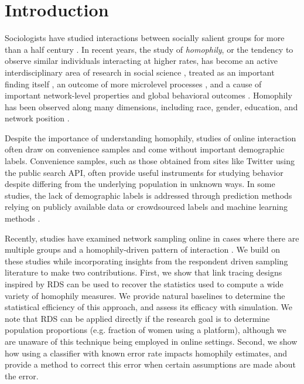 \documentclass[a4paper]{article}
\begin{document}
\section{Introduction}

Sociologists have studied interactions between socially salient groups for more than a half century \cite{coleman_relational_1958,katz_}. In recent years, the study of \emph{homophily}, or the tendency to observe similar individuals interacting at higher rates, has become an active interdisciplinary area of research in social science \cite{mcpherson_birds_2001}, treated as an important finding itself \cite{marsden_core_1987,lewis_tastes_2008}, an outcome of more microlevel processes \cite{currarini_economic_2009,bramoulle_homophily_2012}, and a cause of important network-level properties \cite{barabasi_emergence_1999} and global behavioral outcomes \cite{}. Homophily has been observed along many dimensions, including race, gender, education, and network position \cite{}.

Despite the importance of understanding homophily, studies of online interaction often draw on convenience samples and come without important demographic labels. Convenience samples, such as those obtained from sites like Twitter using the public search API, often provide useful instruments for studying behavior despite differing from the underlying population in unknown ways. In some studies, the lack of demographic labels is addressed through prediction methods relying on publicly available data \cite{} or crowdsourced labels and machine learning methods \cite{}.

Recently, studies have examined network sampling online in cases where there are multiple groups and a homophily-driven pattern of interaction \cite{wang_sampling_2015,karimi_visibility_2017,wagner_sampling_2017}. We build on these studies while incorporating insights from the respondent driven sampling literature \cite{heckathorn_respondent-driven_2002,salganik_sampling_2004,goel_respondent-driven_2009} to make two contributions. First, we show that link tracing designs inspired by RDS can be used to recover the statistics used to compute a wide variety of homophily measures. We provide natural baselines to determine the statistical efficiency of this approach, and assess its efficacy with simulation. We note that RDS can be applied directly if the research goal is to determine population proportions (e.g. fraction of women using a platform), although we are unaware of this technique being employed in online settings. Second, we show how using a classifier with known error rate impacts homophily estimates, and provide a method to correct this error when certain assumptions are made about the error.
\end{document}
